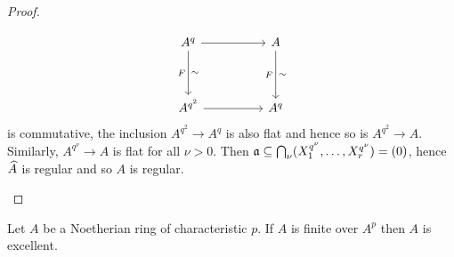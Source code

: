 \documentclass[../main]{subfiles}
\begin{document}
\begin{proof}
\begin{implyenumerate}
    \[\begin{tikzcd}
    	{A^q} && A \\
    	\\
    	{A^{q^2}} && {A^q}
    	\arrow[from=1-1, to=1-3]
    	\arrow[from=3-1, to=3-3]
    	\arrow["F"', "\sim", from=1-1, to=3-1]
    	\arrow["F"', "\sim", from=1-3, to=3-3]
    \end{tikzcd}\]
    is commutative, the inclusion $A^{q^2}\longrightarrow A^q$ is also flat and hence so is $A^{q^2}\longrightarrow A$. Similarly, $A^{q^\nu}\longrightarrow A$ is flat for all $\nu>0$. Then $\mathfrak{a} \subseteq \bigcap_\nu(X_1^{q^\nu}, \dots, X_r^{q^\nu})=(0)$, hence $\widehat{A}$ is regular and so $A$ is regular.
\end{implyenumerate}

\end{proof}

\begin{theorem}[E. Kunz]\label{thm:108}
Let $A$ be a Noetherian ring of characteristic $p$. If $A$ is finite over $A^p$ then $A$ is excellent.
\end{theorem}
\end{document}
